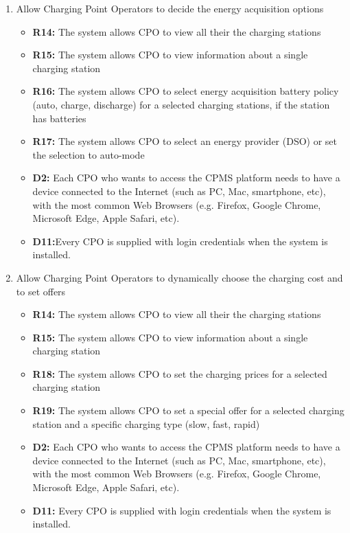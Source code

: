 \begin{enumerate}[label=\textbf{-G\arabic*}:]
{\begin{itemize}
          \end{itemize}
          }


          \item {Allow Charging Point Operators to decide the energy acquisition options
          \begin{itemize}
              \item \textbf{R14:} The system allows CPO to view all their the charging stations 
              \item \textbf{R15:} The system allows CPO to view information about a single charging station
              \item \textbf{R16:} The system allows CPO to select energy acquisition battery policy (auto, charge, discharge) for a selected charging stations, if the station has batteries
              \item \textbf{R17:} The system allows CPO to select an energy provider (DSO) or set the selection to auto-mode 
              \item \textbf{D2:} Each CPO who wants to access the CPMS platform needs to have a device connected to the Internet (such as PC, Mac, smartphone, etc), with the most common Web Browsers (e.g. Firefox, Google Chrome, Microsoft Edge, Apple Safari, etc).
              \item \textbf{D11:}Every CPO is supplied with login credentials when the system is installed.              
          \end{itemize}
          }


          \item {Allow Charging Point Operators to dynamically choose the charging cost and to set offers
          \begin{itemize}
            \item \textbf{R14:} The system allows CPO to view all their the charging stations 
            \item \textbf{R15:} The system allows CPO to view information about a single charging station
            \item \textbf{R18:} The system allows CPO to set the charging prices for a selected charging station
              \item \textbf{R19:} The system allows CPO to set a special offer for a selected charging station and a specific charging type (slow, fast, rapid)
              \item \textbf{D2:} Each CPO who wants to access the CPMS platform needs to have a device connected to the Internet (such as PC, Mac, smartphone, etc), with the most common Web Browsers (e.g. Firefox, Google Chrome, Microsoft Edge, Apple Safari, etc).
              \item \textbf{D11:} Every CPO is supplied with login credentials when the system is installed.              
          \end{itemize}
          }
\end{enumerate}

